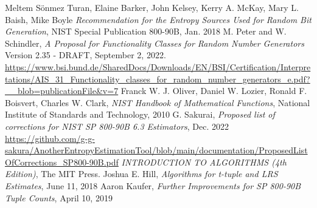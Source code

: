 ﻿\documentclass[a3paper,xelatex,english]{bxjsarticle}
\begin{document}
\clearpage
\setcounter{section}{3}
\begin{thebibliography}{99}
Meltem S\"{o}nmez Turan,
Elaine Barker,
John Kelsey,
Kerry A. McKay,
Mary L. Baish,
Mike Boyle
\textit{Recommendation for the Entropy Sources Used for Random Bit Generation},
NIST Special Publication 800-90B, Jan. 2018
M. Peter and W. Schindler,
\textit{A Proposal for Functionality Classes for Random Number Generators}
Version 2.35 - DRAFT,
September 2, 2022.
\url{https://www.bsi.bund.de/SharedDocs/Downloads/EN/BSI/Certification/Interpretations/AIS_31_Functionality_classes_for_random_number_generators_e.pdf?__blob=publicationFile&v=7}
Franck W. J. Oliver,
Daniel W. Lozier,
Ronald F. Boisvert,
Charles W. Clark,
\textit{NIST Handbook of Mathematical Functions},
National Institute of Standards and Technology, 2010
G. Sakurai, \textit{Proposed list of corrections for NIST SP 800-90B 6.3 Estimators}, Dec. 2022
\url{https://github.com/g-g-sakura/AnotherEntropyEstimationTool/blob/main/documentation/ProposedListOfCorrections_SP800-90B.pdf}
\textit{INTRODUCTION TO ALGORITHMS (4th Edition)}, The MIT Press.
Joshua E. Hill, \textit{Algorithms for t-tuple and LRS Estimates}, June 11, 2018
Aaron Kaufer, \textit{Further Improvements for SP 800-90B Tuple Counts}, April 10, 2019
\end{thebibliography}
\end{document}
